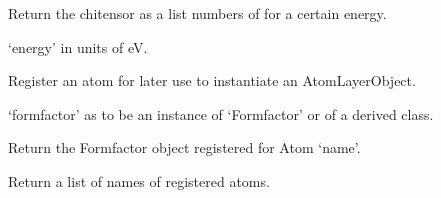 \documentclass[letterpaper,10pt,english]{sphinxmanual}
\begin{document}
\begin{fulllineitems}
\begin{fulllineitems}
\end{fulllineitems}


\begin{fulllineitems}
\label{\detokenize{modules-api/samplerepresentation:SampleRepresentation.AtomLayerObject.getChi}}
Return the chitensor as a list numbers of  for a certain energy.

‘energy’ in units of eV.

\end{fulllineitems}


\begin{fulllineitems}
\label{\detokenize{modules-api/samplerepresentation:SampleRepresentation.AtomLayerObject.registerAtom}}
Register an atom for later use to instantiate an AtomLayerObject.

‘formfactor’ as to be an instance of ‘Formfactor’ or of a derived class.

\end{fulllineitems}


\begin{fulllineitems}
\label{\detokenize{modules-api/samplerepresentation:SampleRepresentation.AtomLayerObject.getAtom}}
Return the Formfactor object registered for Atom ‘name’.

\end{fulllineitems}


\begin{fulllineitems}
\label{\detokenize{modules-api/samplerepresentation:SampleRepresentation.AtomLayerObject.getAtomNames}}
Return a list of names of registered atoms.

\end{fulllineitems}


\end{fulllineitems}
\end{document}
